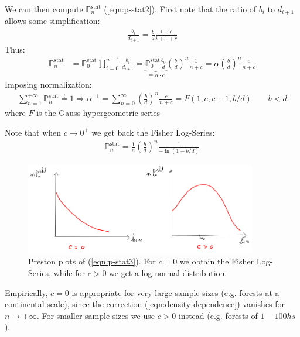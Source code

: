 \documentclass[../../main.tex]{subfiles}
\begin{document}
\medskip

We can then compute $\mathbb{P}_n^{\mathrm{stat}}$ (\ref{eqn:p-stat2}). First note that the ratio of $b_i$ to $d_{i+1}$ allows some simplification:
\begin{align*}
    \frac{b_i}{d_{i+1}} = \frac{b}{d} \frac{i+c}{i+1+c}  
\end{align*}
Thus: %
\begin{align}\label{eqn:p-stat3}
    \mathbb{P}_n^{\mathrm{stat}} &= \mathbb{P}_0^{\mathrm{stat}} \prod_{i=0}^{n-1} \frac{b_i}{d_{i+1}}      = \underbrace{\mathbb{P}_0^{\mathrm{stat}} \frac{b_0}{d}}_{\equiv \alpha \cdot c}  \left(\frac{b}{d} \right)^n \frac{1}{n+c} = \alpha \left(\frac{b}{d} \right)^n \frac{c}{n+c} 
\end{align}
Imposing normalization:
\begin{align*}
    \sum_{n=1}^{+\infty} \mathbb{P}_n^{\mathrm{stat}} \overset{!}{=} 1 \Rightarrow \alpha^{-1} = \sum_{n=0}^\infty \left(\frac{b}{d} \right)^n \frac{c}{n+c} = F(1,c,c+1,b/d) \qquad b < d 
\end{align*}%
where $F$ is the Gauss hypergeometric series %

Note that when $c \to 0^+$ we get back the Fisher Log-Series:
\begin{align*}
    \mathbb{P}_{n}^{\mathrm{stat}} = \frac{1}{n}\left(\frac{b}{d} \right)^n \frac{1}{-\ln (1-b/d)} 
\end{align*}

\begin{figure}[H]
    \centering
    \includegraphics[width=0.9\textwidth]{preston-plots.png}
    \caption{Preston plots of (\ref{eqn:p-stat3}). For $c=0$ we obtain the Fisher Log-Series, while for $c > 0$ we get a log-normal distribution.}
    \label{fig:preston-plots}
\end{figure}

Empirically, $c=0$ is appropriate for very large sample sizes (e.g. forests at a continental scale), since the correction (\ref{eqn:density-dependence}) vanishes for $n \to +\infty$. For smaller sample sizes we use $c > 0$ instead (e.g. forests of $1 - 100 \si{hs}$).
\end{document}
